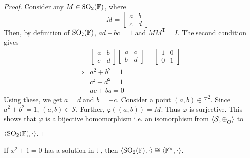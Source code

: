 \begin{proof}
    \noindent
    Consider any $M\in\mathrm{SO}_{2}(\mathbb{F})$, where
    \[ M = \begin{bmatrix}a & b \\ c & d\end{bmatrix} \]
    Then, by definition of $\mathrm{SO}_{2}(\mathbb{F})$, $ad-bc=1$ and
    $MM^\mathrm{T}=I$. The second condition gives
    \begin{align*}
        & \begin{bmatrix}a & b \\ c & d\end{bmatrix} \begin{bmatrix}a & c \\ b & d\end{bmatrix} = \begin{bmatrix}1 & 0 \\ 0 & 1\end{bmatrix} \\
        \implies& a^2 + b^2 = 1 \\
                & c^2 + d^2 = 1 \\
                & ac + bd = 0
    \end{align*}
    Using these, we get $a=d$ and $b=-c$. Consider a point $(a,b)\in\mathbb{F}^2$.
    Since $a^2+b^2=1$, $(a,b)\in\mathcal{S}$. Further, $\varphi((a,b))=M$.
    Thus $\varphi$ is surjective. This shows that $\varphi$ is a bijective
    homomorphism i.e. an isomorphism from $\langle \mathcal{S},\conop \rangle$ to
    $\langle \mathrm{SO}_{2}(\mathbb{F}),\cdot \rangle$.
\end{proof}

\begin{theorem}
    If $x^2+1=0$ has a solution in $\mathbb{F}$, then
    $\langle\mathrm{SO}_{2}(\mathbb{F}),\cdot\rangle \cong \langle\mathbb{F}^\times,\cdot\rangle$.
\end{theorem}

